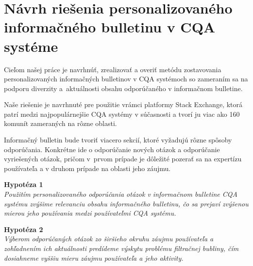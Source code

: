 \afterpage{\blankpage}
\newpage
\chapter{Návrh riešenia personalizovaného informačného bulletinu v CQA systéme}

Cieľom našej práce je navrhnúť, zrealizovať a overiť metódu zostavovania personalizovaných informačných bulletinov v CQA systémoch
so zameraním sa na podporu diverzity a~aktuálnosti obsahu odporúčaného v informačnom bulletine.

Naše riešenie je navrhnuté pre použitie vrámci platformy Stack Exchange, ktorá patrí medzi najpopulárnejšie CQA systémy
v súčasnosti a tvorí ju viac ako 160 komunít zameraných na rôzne oblasti.

Informačný bulletin bude tvoriť viacero sekcií, ktoré vyžadujú rôzne spôsoby odporúčania. Konkrétne ide o odporúčanie
nových otázok a odporúčanie vyriešených otázok, pričom v~prvom prípade je dôležité pozerať sa na expertízu používateľa
a v druhom prípade na oblasti jeho záujmu.

\textbf{Hypotéza 1}\\
\textit{Použitím personalizovaného odporúčania otázok v informačnom bulletine CQA systému zvýšime relevanciu obsahu informačného
bulletinu, čo sa prejaví zvýšenou mierou jeho používania medzi používateľmi CQA systému.}

\textbf{Hypotéza 2}\\
\textit{Výberom odporúčaných otázok zo širšieho okruhu záujmu používateľa a zohľadnením ich aktuálnosti predídeme výskytu problému
filtračnej bubliny, čím dosiahneme vyššiu mieru záujmu používateľa a jeho aktivity.}

